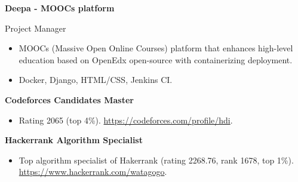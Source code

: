 \documentclass[11pt,a4paper]{altacv}
\newcommand{\cvproject}[1]{%
	{\textbf{\color{accent}#1}\par}
}
\begin{document}
\cvproject{Deepa - MOOCs platform} {Project Manager}
\begin{itemize}
	\item MOOCs (Massive Open Online Courses) platform that enhances high-level education based on OpenEdx open-source with containerizing deployment. 
	\item Docker, Django, HTML/CSS, Jenkins CI.
\end{itemize} 

\cvproject{Codeforces Candidates Master} {}
\smallskip
\begin{itemize}
	\item Rating 2065 (top 4\%). \href{https://codeforces.com/profile/hdi}{https://codeforces.com/profile/hdi}.
\end{itemize}
\smallskip
\cvproject{Hackerrank Algorithm Specialist} {}
\begin{itemize}
	\item Top algorithm specialist of Hakerrank (rating 2268.76, rank 1678, top 1\%). \href{https://www.hackerrank.com/watagogo}{https://www.hackerrank.com/watagogo}.
\end{itemize} 


\clearpage



\end{document}
